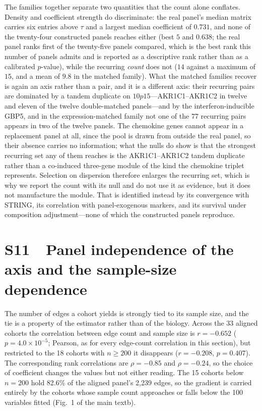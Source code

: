 \documentclass[11pt]{article}
\begin{document}
The families together separate two quantities that the count alone conflates. Density and coefficient strength do discriminate: the real panel's median matrix carries six entries above $\tau$ and a largest median coefficient of $0.731$, and none of the twenty-four constructed panels reaches either (best $5$ and $0.638$; the real panel ranks first of the twenty-five panels compared, which is the best rank this number of panels admits and is reported as a descriptive rank rather than as a calibrated $p$-value), while the recurring \emph{count} does not ($14$ against a maximum of $15$, and a mean of $9.8$ in the matched family). What the matched families recover is again an axis rather than a pair, and it is a different axis: their recurring pairs are dominated by a tandem duplicate on $10p15$---AKR1C1--AKR1C2 in twelve and eleven of the twelve double-matched panels---and by the interferon-inducible GBP5, and in the expression-matched family not one of the $77$ recurring pairs appears in two of the twelve panels. The chemokine genes cannot appear in a replacement panel at all, since the pool is drawn from outside the real panel, so their absence carries no information; what the nulls do show is that the strongest recurring set any of them reaches is the AKR1C1--AKR1C2 tandem duplicate rather than a co-induced three-gene module of the kind the chemokine triplet represents. Selection on dispersion therefore enlarges the recurring set, which is why we report the count with its null and do not use it as evidence, but it does not manufacture the module. That is identified instead by its convergence with STRING, its correlation with panel-exogenous markers, and its survival under composition adjustment---none of which the constructed panels reproduce.

\section*{S11\ \ Panel independence of the axis and the sample-size dependence}

The number of edges a cohort yields is strongly tied to its sample size, and the tie is a property of the estimator rather than of the biology. Across the 33 aligned cohorts the correlation between edge count and sample size is
$r = -0.652$ ($p = 4.0 \times 10^{-5}$; Pearson, as for every edge-count correlation in this
section), but restricted to the 18 cohorts with $n \ge 200$ it disappears ($r = -0.208$,
$p = 0.407$). The corresponding rank correlations are $\rho = -0.85$ and $\rho = -0.24$, so the
choice of coefficient changes the values but not either reading. The 15 cohorts below $n = 200$ hold 82.6\% of the aligned panel's 2{,}239 edges, so the gradient is carried entirely by the cohorts whose sample count approaches or falls below the 100 variables fitted (Fig.~1 of the main textb).
\end{document}
